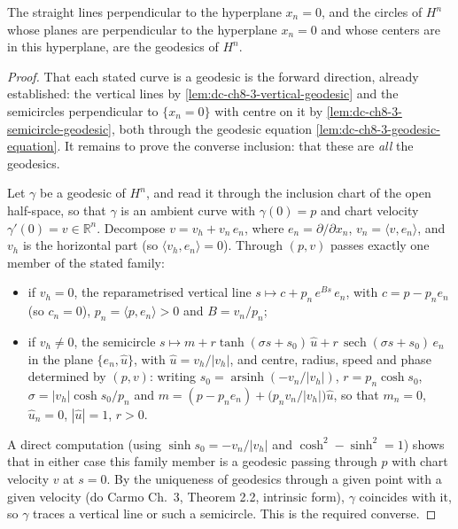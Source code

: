 \begin{proposition}[geodesics of $H^n$]
  \label{prop:dc-ch8-3-1}
  \leanok
  The straight lines perpendicular to the hyperplane $x_n=0$, and the circles of
  $H^n$ whose planes are perpendicular to the hyperplane $x_n=0$ and whose centers
  are in this hyperplane, are the geodesics of $H^n$.
\end{proposition}
\begin{proof}
  \leanok
  That each stated curve is a geodesic is the forward direction, already established:
  the vertical lines by \cref{lem:dc-ch8-3-vertical-geodesic} and the semicircles
  perpendicular to $\{x_n=0\}$ with centre on it by
  \cref{lem:dc-ch8-3-semicircle-geodesic}, both through the geodesic equation
  \cref{lem:dc-ch8-3-geodesic-equation}. It remains to prove the converse inclusion:
  that these are \emph{all} the geodesics.

  Let $\gamma$ be a geodesic of $H^n$, and read it through the inclusion chart of the
  open half-space, so that $\gamma$ is an ambient curve with $\gamma(0)=p$ and chart
  velocity $\gamma'(0)=v\in\mathbb R^n$. Decompose $v=v_h+v_n\,e_n$, where
  $e_n=\partial/\partial x_n$, $v_n=\langle v,e_n\rangle$, and $v_h$ is the horizontal
  part (so $\langle v_h,e_n\rangle=0$). Through $(p,v)$ passes exactly one member of
  the stated family:
  \begin{itemize}
    \item if $v_h=0$, the reparametrised vertical line
      $s\mapsto c+p_n\,e^{Bs}\,e_n$, with $c=p-p_n e_n$ (so $c_n=0$), $p_n=\langle
      p,e_n\rangle>0$ and $B=v_n/p_n$;
    \item if $v_h\neq0$, the semicircle
      $s\mapsto m+r\tanh(\sigma s+s_0)\,\hat u+r\,\operatorname{sech}(\sigma s+s_0)\,e_n$
      in the plane $\{e_n,\hat u\}$, with $\hat u=v_h/|v_h|$, and centre, radius,
      speed and phase determined by $(p,v)$: writing $s_0=\operatorname{arsinh}(-v_n/|v_h|)$,
      $r=p_n\cosh s_0$, $\sigma=|v_h|\cosh s_0/p_n$ and
      $m=(p-p_n e_n)+\bigl(p_n v_n/|v_h|\bigr)\hat u$, so that $m_n=0$, $\hat u_n=0$,
      $|\hat u|=1$, $r>0$.
  \end{itemize}
  A direct computation (using $\sinh s_0=-v_n/|v_h|$ and
  $\cosh^2-\sinh^2=1$) shows that in either case this family member is a geodesic
  passing through $p$ with chart velocity $v$ at $s=0$. By the uniqueness of geodesics
  through a given point with a given velocity (do Carmo Ch.~3, Theorem 2.2, intrinsic
  form), $\gamma$ coincides with it, so $\gamma$ traces a vertical line or such a
  semicircle. This is the required converse.


\end{proof}
